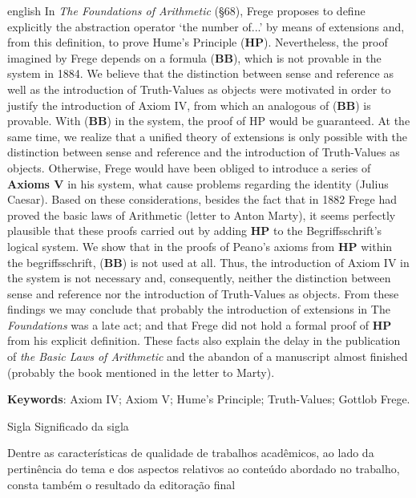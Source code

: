 \documentclass[12pt]{abntex2}
\begin{document}
\begin{resumo}[Abstract]
\begin{otherlanguage*}{english}
In \textit{The Foundations of Arithmetic} (§68), Frege proposes to define explicitly the abstraction operator `the number of...' by means of extensions and, from this definition, to prove Hume's Principle (\textbf{HP}). Nevertheless, the proof imagined by Frege depends on a formula (\textbf{BB}), which is not provable in the system in 1884. We believe that the distinction between sense and reference as well as the introduction of Truth-Values as objects were motivated in order to justify the introduction of Axiom IV, from which an analogous of (\textbf{BB}) is provable. With (\textbf{BB}) in the system, the proof of HP would be guaranteed. At the same time, we realize that a unified theory of extensions is only possible with the distinction between sense and reference and the introduction of Truth-Values as objects. Otherwise, Frege would have been obliged to introduce a series of \textbf{Axioms V} in his system, what cause problems regarding the identity (Julius Caesar). Based on these considerations, besides the fact that in 1882 Frege had proved the basic laws of Arithmetic (letter to Anton Marty), it seems perfectly plausible that these proofs carried out by adding \textbf{HP} to the Begriffsschrift's logical system. We show that in the proofs of Peano's axioms from \textbf{HP} within the begriffsschrift, (\textbf{BB}) is not used at all. Thus, the introduction of Axiom IV in the system is not necessary and, consequently, neither the distinction between sense and reference nor the introduction of Truth-Values as objects. From these findings we may conclude that probably the introduction of extensions in The \textit{Foundations} was a late act; and that Frege did not hold a formal proof of \textbf{HP} from his explicit definition. These facts also explain the delay in the publication of \textit{the Basic Laws of Arithmetic} and the abandon of a manuscript almost finished (probably the book mentioned in the letter to Marty).
\vspace{\onelineskip}
\par
\noindent \textbf{Keywords}: Axiom IV; Axiom V; Hume's Principle; Truth-Values; Gottlob Frege. 
\end{otherlanguage*} 
\end{resumo}


\begin{siglas}
\item[Sigla] Significado da sigla
\end{siglas}


\begin{citacao}
Dentre as características de qualidade de trabalhos acadêmicos,
ao lado da pertinência do tema e dos aspectos relativos ao conteúdo
abordado no trabalho, consta também o resultado da editoração final
\end{citacao}
\end{document}
